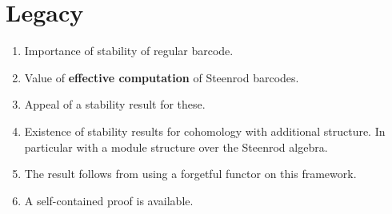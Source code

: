 
\section{Legacy}

\begin{enumerate}
	\item Importance of stability of regular barcode.
	\item Value of \textbf{effective computation} of Steenrod barcodes.
	\item Appeal of a stability result for these.
	\item Existence of stability results for cohomology with additional structure.
	In particular with a module structure over the Steenrod algebra.
	\item The result follows from using a forgetful functor on this framework.
	\item A self-contained proof is available.
\end{enumerate}